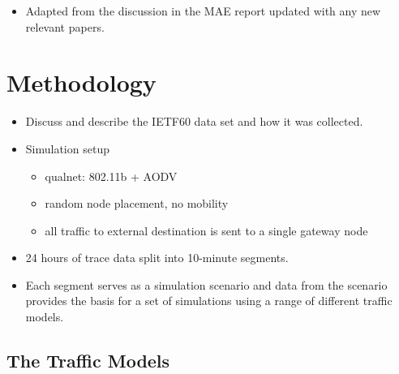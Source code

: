 \documentclass{article}
\begin{document}
\begin{itemize}
\item Adapted from the discussion in the MAE report updated with any new relevant papers.
\end{itemize}

\section{Methodology}

\begin{itemize}
\item Discuss and describe the IETF60 data set and how it was collected.
\item Simulation setup
\begin{itemize}
\item qualnet: 802.11b + AODV
\item  random node placement, no mobility
\item all traffic to external destination is sent to a single gateway node
\end{itemize}
\item 24 hours of trace data split into 10-minute segments.
\item Each segment serves as a simulation scenario and data from the scenario provides the basis for a set of simulations using a range of different traffic models.
\end{itemize}

\subsection{The Traffic Models}
\end{document}
